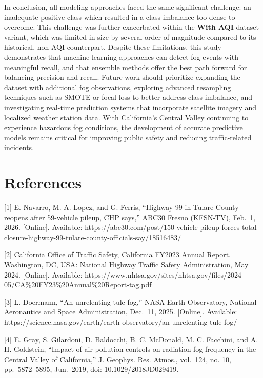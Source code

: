 \documentclass[
  letterpaper,
  DIV=11,
  numbers=noendperiod]{scrartcl}
\begin{document}
In conclusion, all modeling approaches faced the same significant
challenge: an inadequate positive class which resulted in a class
imbalance too dense to overcome. This challenge was further exacerbated
within the \textbf{With AQI} dataset variant, which was limited in size
by several order of magnitude compared to its historical, non-AQI
counterpart. Despite these limitations, this study demonstrates that
machine learning approaches can detect fog events with meaningful
recall, and that ensemble methods offer the best path forward for
balancing precision and recall. Future work should prioritize expanding
the dataset with additional fog observations, exploring advanced
resampling techniques such as SMOTE or focal loss to better address
class imbalance, and investigating real-time prediction systems that
incorporate satellite imagery and localized weather station data. With
California's Central Valley continuing to experience hazardous fog
conditions, the development of accurate predictive models remains
critical for improving public safety and reducing traffic-related
incidents.

\section{References}\label{references}

{[}1{]} E. Navarro, M. A. Lopez, and G. Ferris, ``Highway 99 in Tulare
County reopens after 59-vehicle pileup, CHP says,'' ABC30 Fresno
(KFSN-TV), Feb.~1, 2026. {[}Online{]}. Available:
https://abc30.com/post/150-vehicle-pileup-forces-total-closure-highway-99-tulare-county-officials-say/18516483/

{[}2{]} California Office of Traffic Safety, California FY2023 Annual
Report. Washington, DC, USA: National Highway Traffic Safety
Administration, May 2024. {[}Online{]}. Available:
https://www.nhtsa.gov/sites/nhtsa.gov/files/2024-05/CA\%20FY23\%20Annual\%20Report-tag.pdf

{[}3{]} L. Doermann, ``An unrelenting tule fog,'' NASA Earth
Observatory, National Aeronautics and Space Administration, Dec.~11,
2025. {[}Online{]}. Available:
https://science.nasa.gov/earth/earth-observatory/an-unrelenting-tule-fog/

{[}4{]} E. Gray, S. Gilardoni, D. Baldocchi, B. C. McDonald, M. C.
Facchini, and A. H. Goldstein, ``Impact of air pollution controls on
radiation fog frequency in the Central Valley of California,'' J.
Geophys. Res. Atmos., vol.~124, no. 10, pp.~5872--5895, Jun.~2019, doi:
10.1029/2018JD029419.
\end{document}
